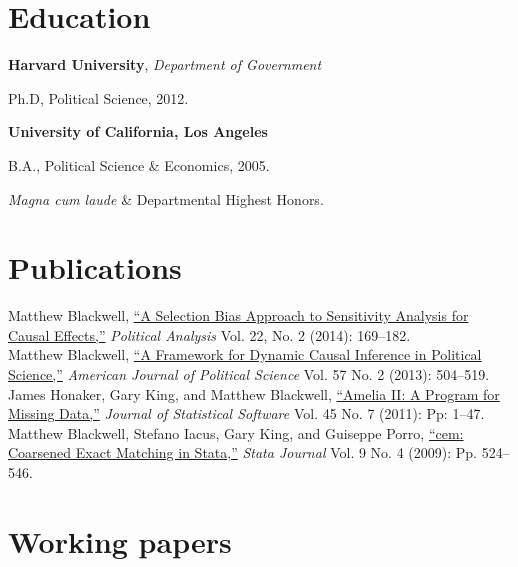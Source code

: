 \documentclass[margin,line]{res}
\newenvironment{list1}{
  \begin{list}{\ding{113}}{%
      \setlength{\itemsep}{0in}
      \setlength{\parsep}{0in} \setlength{\parskip}{0in}
      \setlength{\topsep}{0in} \setlength{\partopsep}{0in} 
      \setlength{\leftmargin}{0.83 cm}}}{\end{list}}
\begin{document}
\begin{resume}
\section{\sc Education}

{\bf Harvard University}, {\em Department of Government}
\begin{list1}
\item[] Ph.D, Political Science, 2012. 
\end{list1}
{\bf University of California, Los Angeles}
\begin{list1}
\item[] B.A., Political Science \& Economics, 2005.
\item[] \emph{Magna cum laude} \& Departmental Highest Honors.
\end{list1}

\section{\sc Publications}
Matthew Blackwell, \href{http://gking.harvard.edu/files/sens.pdf}{``A Selection Bias Approach to Sensitivity
Analysis for Causal Effects,''} \emph{Political Analysis} Vol. 22, No. 2 (2014): 169--182.\vspace{1em}\\
Matthew Blackwell,
\href{http://mattblackwell.org/files/papers/dynci.pdf}{``A Framework
  for Dynamic Causal Inference in Political Science,''}
\emph{American Journal of Political Science} Vol. 57 No. 2 (2013): 504--519.\vspace{1em}\\
James Honaker, Gary King, and Matthew Blackwell, \href{http://www.mattblackwell.org/files/papers/amelia-jss.pdf}{``Amelia II: A
Program for Missing Data,''} \emph{Journal of Statistical Software}
Vol. 45 No. 7 (2011): Pp: 1--47.
\vspace{1em}\\
Matthew Blackwell, Stefano Iacus, Gary King, and Guiseppe Porro, \href{http://www.mattblackwell.org/files/papers/cemStata.pdf}{``cem: Coarsened Exact Matching in Stata,''} \emph{Stata
  Journal} Vol. 9 No. 4 (2009): Pp. 524--546.

\section{\sc Working papers}


\end{resume}
\end{document}
